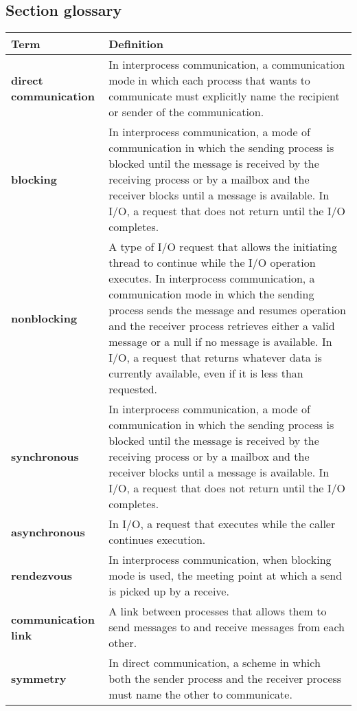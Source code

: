\subsection*{Section glossary}
\centering
\begin{tabular}{>{\raggedright}p{} >{\raggedright\arraybackslash}p{}}
\toprule
\textbf{Term} & \textbf{Definition} \\
\midrule
\textbf{direct communication} & In interprocess communication, a communication mode in which each process that wants to communicate must explicitly name the recipient or sender of the communication. \\
\textbf{blocking} & In interprocess communication, a mode of communication in which the sending process is blocked until the message is received by the receiving process or by a mailbox and the receiver blocks until a message is available. In I/O, a request that does not return until the I/O completes. \\
\textbf{nonblocking} & A type of I/O request that allows the initiating thread to continue while the I/O operation executes. In interprocess communication, a communication mode in which the sending process sends the message and resumes operation and the receiver process retrieves either a valid message or a null if no message is available. In I/O, a request that returns whatever data is currently available, even if it is less than requested. \\
\textbf{synchronous} & In interprocess communication, a mode of communication in which the sending process is blocked until the message is received by the receiving process or by a mailbox and the receiver blocks until a message is available. In I/O, a request that does not return until the I/O completes. \\
\textbf{asynchronous} & In I/O, a request that executes while the caller continues execution. \\
\textbf{rendezvous} & In interprocess communication, when blocking mode is used, the meeting point at which a send is picked up by a receive. \\
\textbf{communication link} & A link between processes that allows them to send messages to and receive messages from each other. \\
\textbf{symmetry} & In direct communication, a scheme in which both the sender process and the receiver process must name the other to communicate. \\

\end{tabular}
